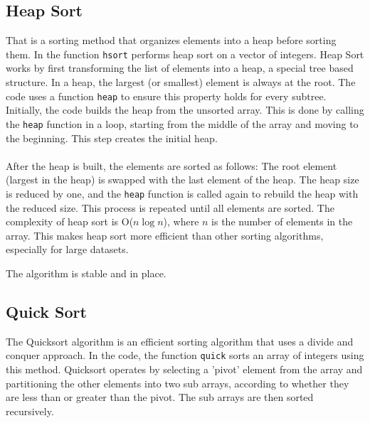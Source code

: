 \documentclass{article}
\begin{document}
\subsection{Heap Sort}
That is a sorting method that organizes elements into a heap before sorting them. 
In the function \texttt{hsort} performs heap sort on a vector of integers.
Heap Sort works by first transforming the list of elements into a heap, a special tree based structure. 
In a heap, the largest (or smallest) element is always at the root. 
The code uses a function \texttt{heap} to ensure this property holds for every subtree.
Initially, the code builds the heap from the unsorted array. 
This is done by calling the \texttt{heap} function in a loop, starting from the middle of the array and moving to the beginning. 
This step creates the initial heap.
\paragraph{}
After the heap is built, the elements are sorted as follows: The root element (largest in the heap) is swapped with the last element of the heap. 
The heap size is reduced by one, and the \texttt{heap} function is called again to rebuild the heap with the reduced size. 
This process is repeated until all elements are sorted.
The complexity of heap sort is O($n\log n$), where $n$ is the number of elements in the array. 
This makes heap sort more efficient than other sorting algorithms, especially for large datasets.

The algorithm is stable and in place.

\subsection{Quick Sort}
The Quicksort algorithm is an efficient sorting algorithm that uses a divide and conquer approach.
In the code, the function \texttt{quick} sorts an array of integers using this method.
Quicksort operates by selecting a 'pivot' element from the array and partitioning the other elements into two sub arrays, according to whether they are less than or greater than the pivot. 
The sub arrays are then sorted recursively.
\end{document}

